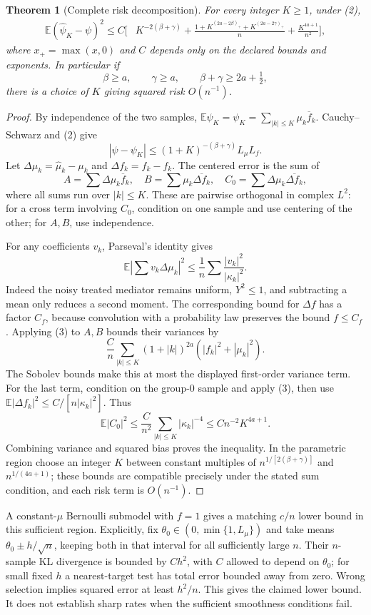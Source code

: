 \documentclass[11pt,a4paper]{article}
\newtheorem{theorem}{Theorem}[section]
\theoremstyle{definition}
\theoremstyle{remark}
\newcommand{\E}{\mathbb E}
\begin{document}
\begin{theorem}[Complete risk decomposition]
For every integer $K\ge1$, under (2),
\begin{align*}
 \E(\hat\psi_K-\psi)^2\le C\bigg[&K^{-2(\beta+\gamma)}
 +\frac{1+K^{(2a-2\beta)_+}+K^{(2a-2\gamma)_+}}n
 +\frac{K^{4a+1}}{n^2}\bigg],
\end{align*}
where $x_+=\max(x,0)$ and $C$ depends only on the declared bounds and exponents. In particular if
\[
 \beta\ge a,\qquad \gamma\ge a,\qquad
 \beta+\gamma\ge2a+\tfrac12,
\]
there is a choice of $K$ giving squared risk $O(n^{-1})$.
\end{theorem}
\begin{proof}
By independence of the two samples,
$\E\hat\psi_K=\psi_K=\sum_{|k|\le K}\mu_k\overline f_k$.
Cauchy--Schwarz and (2) give
\[
 |\psi-\psi_K|\le (1+K)^{-(\beta+\gamma)}L_\mu L_f.
\]
Let $\Delta\mu_k=\hat\mu_k-\mu_k$ and $\Delta f_k=\hat f_k-f_k$. The centered error is the sum of
\[
 A=\sum\Delta\mu_k\overline f_k,\quad
 B=\sum\mu_k\overline{\Delta f_k},\quad
 C_0=\sum\Delta\mu_k\overline{\Delta f_k},
\]
where all sums run over $|k|\le K$. These are pairwise orthogonal in complex $L^2$: for a cross term involving $C_0$, condition on one sample and use centering of the other; for $A,B$, use independence.

For any coefficients $v_k$, Parseval's identity gives
\[
 \E\left|\sum v_k\Delta\mu_k\right|^2
 \le\frac1n\sum\frac{|v_k|^2}{|\kappa_k|^2}.
 \tag{3}
\]
Indeed the noisy treated mediator remains uniform, $Y^2\le1$, and subtracting a mean only reduces a second moment. The corresponding bound for $\Delta f$ has a factor $C_f$, because convolution with a probability law preserves the bound $f\le C_f$. Applying (3) to $A,B$ bounds their variances by
\[
 \frac Cn\sum_{|k|\le K}(1+|k|)^{2a}
                           (|f_k|^2+|\mu_k|^2).
\]
The Sobolev bounds make this at most the displayed first-order variance term. For the last term, condition on the group-0 sample and apply (3), then use
$\E|\Delta f_k|^2\le C/[n|\kappa_k|^2]$. Thus
\[
 \E|C_0|^2\le\frac C{n^2}\sum_{|k|\le K}|\kappa_k|^{-4}
              \le Cn^{-2}K^{4a+1}.
\]
Combining variance and squared bias proves the inequality. In the parametric region choose an integer $K$ between constant multiples of
$n^{1/[2(\beta+\gamma)]}$ and $n^{1/(4a+1)}$; these bounds are compatible precisely under the stated sum condition, and each risk term is $O(n^{-1})$.
\end{proof}

A constant-$\mu$ Bernoulli submodel with $f=1$ gives a matching $c/n$ lower bound in this sufficient region. Explicitly, fix $\theta_0\in(0,\min\{1,L_\mu\})$ and take means $\theta_0\pm h/\sqrt n$, keeping both in that interval for all sufficiently large $n$. Their $n$-sample KL divergence is bounded by $Ch^2$, with $C$ allowed to depend on $\theta_0$; for small fixed $h$ a nearest-target test has total error bounded away from zero. Wrong selection implies squared error at least $h^2/n$. This gives the claimed lower bound. It does not establish sharp rates when the sufficient smoothness conditions fail.
\end{document}
